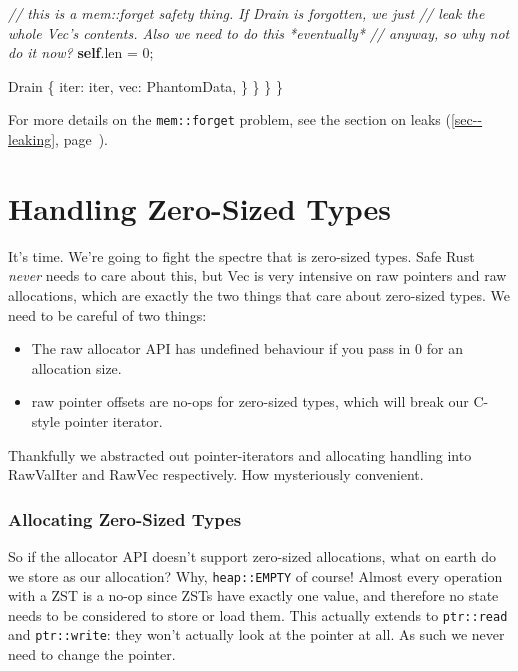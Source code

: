 \documentclass[a4paper,]{book}
\renewcommand*{\hyperref}[2][\ar]{%
  \def\ar{#2}%
  #2 (\autoref{#1}, page~\pageref{#1})}
\newenvironment{Shaded}{\begin{snugshade}}{\end{snugshade}}
\newcommand{\KeywordTok}[1]{\textcolor[rgb]{0.13,0.29,0.53}{\textbf{{#1}}}}
\newcommand{\DecValTok}[1]{\textcolor[rgb]{0.00,0.00,0.81}{{#1}}}
\newcommand{\CommentTok}[1]{\textcolor[rgb]{0.56,0.35,0.01}{\textit{{#1}}}}
\newcommand{\NormalTok}[1]{{#1}}
\providecommand{\tightlist}{%
  \setlength{\itemsep}{0pt}\setlength{\parskip}{0pt}}
\begin{document}
\begin{Shaded}
\begin{Highlighting}[]
            \CommentTok{// this is a mem::forget safety thing. If Drain is forgotten, we just}
            \CommentTok{// leak the whole Vec's contents. Also we need to do this *eventually*}
            \CommentTok{// anyway, so why not do it now?}
            \KeywordTok{self}\NormalTok{.len = }\DecValTok{0}\NormalTok{;}

            \NormalTok{Drain \{}
                \NormalTok{iter: iter,}
                \NormalTok{vec: PhantomData,}
            \NormalTok{\}}
        \NormalTok{\}}
    \NormalTok{\}}
\NormalTok{\}}
\end{Highlighting}
\end{Shaded}

For more details on the \texttt{mem::forget} problem, see the
\hyperref[sec--leaking]{section on leaks}.

\section{Handling Zero-Sized Types}\label{sec--vec-zsts}

It's time. We're going to fight the spectre that is zero-sized types.
Safe Rust \emph{never} needs to care about this, but Vec is very
intensive on raw pointers and raw allocations, which are exactly the two
things that care about zero-sized types. We need to be careful of two
things:

\begin{itemize}
\tightlist
\item
  The raw allocator API has undefined behaviour if you pass in 0 for an
  allocation size.
\item
  raw pointer offsets are no-ops for zero-sized types, which will break
  our C-style pointer iterator.
\end{itemize}

Thankfully we abstracted out pointer-iterators and allocating handling
into RawValIter and RawVec respectively. How mysteriously convenient.

\subsubsection{Allocating Zero-Sized
Types}\label{allocating-zero-sized-types}

So if the allocator API doesn't support zero-sized allocations, what on
earth do we store as our allocation? Why, \texttt{heap::EMPTY} of
course! Almost every operation with a ZST is a no-op since ZSTs have
exactly one value, and therefore no state needs to be considered to
store or load them. This actually extends to \texttt{ptr::read} and
\texttt{ptr::write}: they won't actually look at the pointer at all. As
such we never need to change the pointer.
\end{document}
